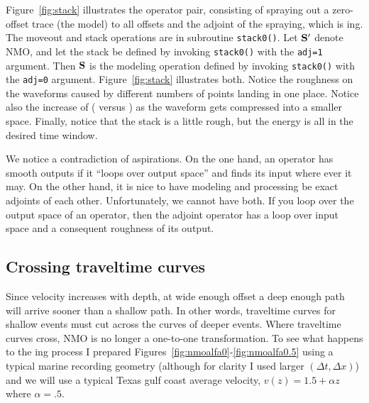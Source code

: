 \par
Figure~\ref{fig:stack} illustrates the operator pair, consisting
of spraying out a zero-offset trace (the model) to all offsets
and the adjoint of the spraying,
which is ing.
The moveout and stack operations are in subroutine {\tt stack0()}.
%
Let $\bold S'$ denote NMO, and let the stack be
defined by invoking {\tt stack0()} with the {\tt adj=1} argument.
Then $\bold S$ is the modeling operation
defined by invoking {\tt stack0()} with the {\tt adj=0} argument.
Figure~\ref{fig:stack} illustrates both.%
Notice the roughness on the waveforms caused by
different numbers of points landing in one place.
Notice also the increase of 
( versus )
as the waveform gets compressed into a smaller space.
Finally, notice that the stack is a little rough,
but the energy is all in the desired time window.

\par
We notice a contradiction of aspirations.
On the one hand,
an operator has smooth outputs if it
``loops over output space''
and finds its input where ever it may.
On the other hand,
it is nice to have modeling and processing
be exact adjoints of each other.
Unfortunately,
we cannot have both.
If you loop over the output space of an operator,
then the adjoint operator has a loop over input space
and a consequent roughness of its output.

\subsection{Crossing traveltime curves}
\par
Since velocity increases with depth,
at wide enough offset a deep enough path
will arrive sooner than a shallow path.
In other words,
traveltime curves for shallow events
must cut across the curves of deeper events.
Where traveltime curves cross,
NMO is no longer a one-to-one transformation.
To see what happens to the ing process
I prepared Figures~\ref{fig:nmoalfa0}-\ref{fig:nmoalfa0.5}
using a typical marine recording geometry
(although for clarity I used
larger $(\Delta t,\Delta x)$) and we will use
a typical Texas gulf coast average velocity,
$v(z)=1.5+\alpha z$ where $\alpha=.5$.

